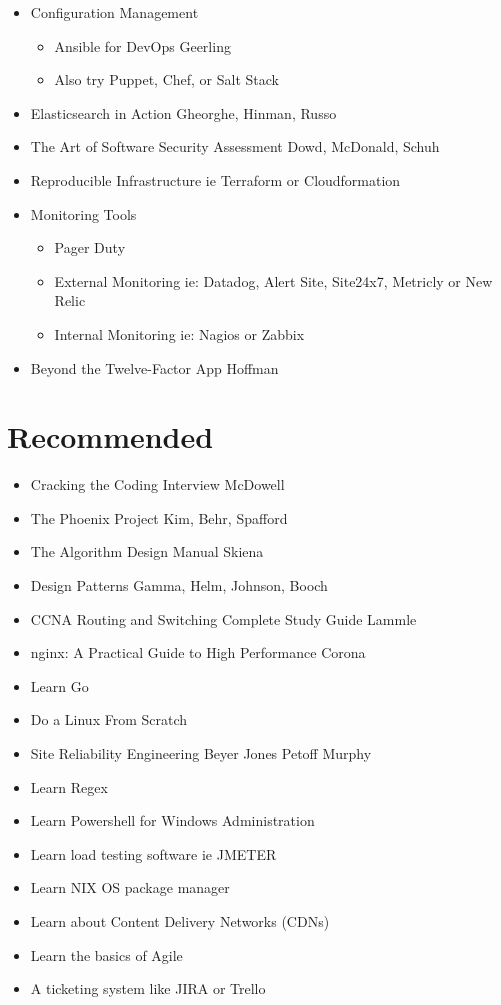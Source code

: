 \documentclass[12pt]{article}
\begin{document}
\begin{itemize}
\item Configuration Management
  \begin{itemize}
  \item Ansible for DevOps Geerling 
  \item Also try Puppet, Chef, or Salt Stack
  \end{itemize}
\item Elasticsearch in Action Gheorghe, Hinman,‎ Russo
\item The Art of Software Security Assessment Dowd, McDonald, Schuh
\item Reproducible Infrastructure ie Terraform or Cloudformation
\item Monitoring Tools
  \begin{itemize}
  \item Pager Duty
  \item External Monitoring ie: Datadog, Alert Site, Site24x7,
    Metricly or New Relic
  \item Internal Monitoring ie: Nagios or Zabbix
  \end{itemize}
\item Beyond the Twelve-Factor App Hoffman
\end{itemize}

\section{Recommended}
\begin{itemize}
\item Cracking the Coding Interview McDowell
\item The Phoenix Project Kim,‎ Behr,‎ Spafford
\item The Algorithm Design Manual Skiena
\item Design Patterns Gamma, Helm, Johnson, Booch
\item CCNA Routing and Switching Complete Study Guide Lammle
\item nginx: A Practical Guide to High Performance Corona
\item Learn Go
\item Do a Linux From Scratch
\item Site Reliability Engineering Beyer Jones Petoff Murphy
\item Learn Regex
\item Learn Powershell for Windows Administration
\item Learn load testing software ie JMETER
\item Learn NIX OS package manager
\item Learn about Content Delivery Networks (CDNs)
\item Learn the basics of Agile
\item A ticketing system like JIRA or Trello
\end{itemize}
\end{document}
